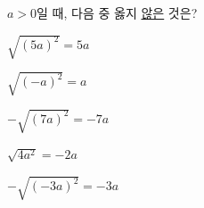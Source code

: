$a>0$일 때, 다음 중 옳지 \underline{않은} 것은?
\begin{choices32}{\rule[-3ex]{0pt}{8ex}$\sqrt{(5a)^2}=5a$}{\rule[-3ex]{0pt}{8ex}$\sqrt{(-a)^2}=a$}{\rule[-3ex]{0pt}{8ex}$-\sqrt{(7a)^2}=-7a$}{\rule[-3ex]{0pt}{8ex}$\sqrt{4a^2}=-2a$}{\rule[-3ex]{0pt}{8ex}$-\sqrt{(-3a)^2}=-3a$}\end{choices32}

